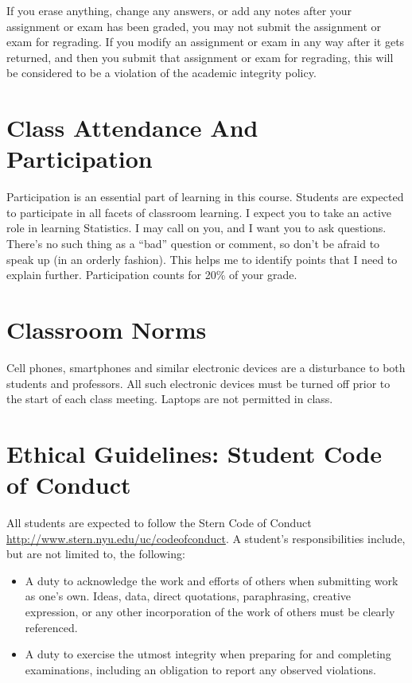 \documentclass[11pt]{article}
\begin{document}
If you erase anything, change any answers, or add any notes after your
assignment or exam has been graded, you may not submit the assignment or exam
for regrading.  If you modify an assignment or exam in any way after it gets
returned, and then you submit that assignment or exam for regrading, this will
be considered to be a violation of the academic integrity policy.



\section*{Class Attendance And Participation}
Participation is an essential part of learning in this course.  Students are
expected to participate in all facets of classroom learning. I expect you to
take an active role in learning Statistics. I may call on you, and I want you
to ask questions. There's no such thing as a ``bad'' question or comment, so
don't be afraid to speak up (in an orderly fashion). This helps me to identify
points that I need to explain further. Participation counts for 20\% of your grade.

\section*{Classroom Norms}

Cell phones, smartphones and similar electronic devices are a disturbance to
both students and professors.  All such electronic devices must be turned off
prior to the start of each class meeting.  Laptops are not permitted in class.


\section*{Ethical Guidelines: Student Code of Conduct}

All students are expected to follow the Stern Code of Conduct
\url{http://www.stern.nyu.edu/uc/codeofconduct}. A student’s responsibilities
include, but are not limited to, the following:

\begin{itemize}

  \item A duty to acknowledge the work and efforts of others when submitting
  work as one’s own.  Ideas, data, direct quotations, paraphrasing, creative
  expression, or any other incorporation of the work of others must be clearly
  referenced.

  \item A duty to exercise the utmost integrity when preparing for and
  completing examinations, including an obligation to report any observed
  violations.

\end{itemize}
\end{document}
